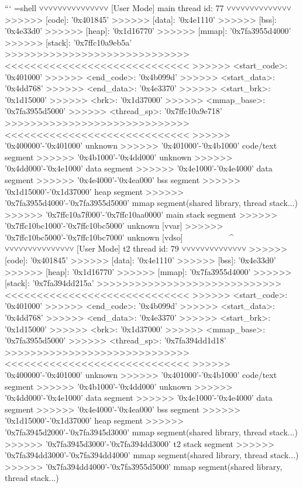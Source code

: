 \documentclass[]{article}
\begin{document}
\begin{markdown}
``` ={shell}
˅˅˅˅˅˅˅˅˅˅˅˅˅˅˅ [User Mode] main thread id: 77 ˅˅˅˅˅˅˅˅˅˅˅˅˅˅
>>>>>> [code]:          '0x401845'
>>>>>> [data]:          '0x4e1110'
>>>>>> [bss]:           '0x4e33d0'
>>>>>> [heap]:          '0x1d16770'
>>>>>> [mmap]:          '0x7fa3955d4000'
>>>>>> [stack]:         '0x7ffc10a9eb5a'
>>>>>>>>>>>>>>>>>>>>>>>>>>>>><<<<<<<<<<<<<<<<<<<<<<<<<<<<<
>>>>>> <start_code>:    '0x401000'
>>>>>> <end_code>:      '0x4b099d'
>>>>>> <start_data>:    '0x4dd768'
>>>>>> <end_data>:      '0x4e3370'
>>>>>> <start_brk>:     '0x1d15000'
>>>>>> <brk>:           '0x1d37000'
>>>>>> <mmap_base>:     '0x7fa3955d5000'
>>>>>> <thread_sp>:     '0x7ffc10a9e718'
>>>>>>>>>>>>>>>>>>>>>>>>>>>>><<<<<<<<<<<<<<<<<<<<<<<<<<<<<
>>>>>> '0x400000'-'0x401000' unknown
>>>>>> '0x401000'-'0x4b1000' code/text segment
>>>>>> '0x4b1000'-'0x4dd000' unknown
>>>>>> '0x4dd000'-'0x4e1000' data segment
>>>>>> '0x4e1000'-'0x4e4000' data segment
>>>>>> '0x4e4000'-'0x4ea000' bss segment
>>>>>> '0x1d15000'-'0x1d37000' heap segment
>>>>>> '0x7fa3955d4000'-'0x7fa3955d5000' mmap segment(shared library, thread stack...)
>>>>>> '0x7ffc10a7f000'-'0x7ffc10aa0000' main stack segment
>>>>>> '0x7ffc10bc1000'-'0x7ffc10bc5000' unknown [vvar]
>>>>>> '0x7ffc10bc5000'-'0x7ffc10bc7000' unknown [vdso]
^^^^^^^^^^^^^^^^^^^^^^^^^^^^^^^^^^^^^^^^^^^^^^^^^^^^^^^^^^
˅˅˅˅˅˅˅˅˅˅˅˅˅˅˅ [User Mode] t2 thread id: 79 ˅˅˅˅˅˅˅˅˅˅˅˅˅˅
>>>>>> [code]:          '0x401845'
>>>>>> [data]:          '0x4e1110'
>>>>>> [bss]:           '0x4e33d0'
>>>>>> [heap]:          '0x1d16770'
>>>>>> [mmap]:          '0x7fa3955d4000'
>>>>>> [stack]:         '0x7fa394dd215a'
>>>>>>>>>>>>>>>>>>>>>>>>>>>>><<<<<<<<<<<<<<<<<<<<<<<<<<<<<
>>>>>> <start_code>:    '0x401000'
>>>>>> <end_code>:      '0x4b099d'
>>>>>> <start_data>:    '0x4dd768'
>>>>>> <end_data>:      '0x4e3370'
>>>>>> <start_brk>:     '0x1d15000'
>>>>>> <brk>:           '0x1d37000'
>>>>>> <mmap_base>:     '0x7fa3955d5000'
>>>>>> <thread_sp>:     '0x7fa394dd1d18'
>>>>>>>>>>>>>>>>>>>>>>>>>>>>><<<<<<<<<<<<<<<<<<<<<<<<<<<<<
>>>>>> '0x400000'-'0x401000' unknown
>>>>>> '0x401000'-'0x4b1000' code/text segment
>>>>>> '0x4b1000'-'0x4dd000' unknown
>>>>>> '0x4dd000'-'0x4e1000' data segment
>>>>>> '0x4e1000'-'0x4e4000' data segment
>>>>>> '0x4e4000'-'0x4ea000' bss segment
>>>>>> '0x1d15000'-'0x1d37000' heap segment
>>>>>> '0x7fa3945d2000'-'0x7fa3945d3000' mmap segment(shared library, thread stack...)
>>>>>> '0x7fa3945d3000'-'0x7fa394dd3000' t2 stack segment
>>>>>> '0x7fa394dd3000'-'0x7fa394dd4000' mmap segment(shared library, thread stack...)
>>>>>> '0x7fa394dd4000'-'0x7fa3955d5000' mmap segment(shared library, thread stack...)

\end{markdown}
\end{document}
